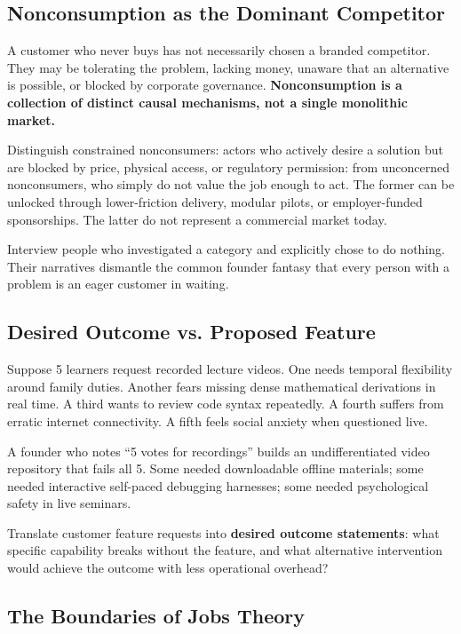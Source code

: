 \subsection{Nonconsumption as the Dominant Competitor}

A customer who never buys has not necessarily chosen a branded competitor. They may be tolerating the problem, lacking money, unaware that an alternative is possible, or blocked by corporate governance. \textbf{Nonconsumption is a collection of distinct causal mechanisms, not a single monolithic market.}

Distinguish constrained nonconsumers: actors who actively desire a solution but are blocked by price, physical access, or regulatory permission: from unconcerned nonconsumers, who simply do not value the job enough to act. The former can be unlocked through lower-friction delivery, modular pilots, or employer-funded sponsorships. The latter do not represent a commercial market today.

Interview people who investigated a category and explicitly chose to do nothing. Their narratives dismantle the common founder fantasy that every person with a problem is an eager customer in waiting.

\subsection{Desired Outcome vs. Proposed Feature}

Suppose 5 learners request recorded lecture videos. One needs temporal flexibility around family duties. Another fears missing dense mathematical derivations in real time. A third wants to review code syntax repeatedly. A fourth suffers from erratic internet connectivity. A fifth feels social anxiety when questioned live.

A founder who notes ``5 votes for recordings'' builds an undifferentiated video repository that fails all 5. Some needed downloadable offline materials; some needed interactive self-paced debugging harnesses; some needed psychological safety in live seminars.

Translate customer feature requests into \textbf{desired outcome statements}: what specific capability breaks without the feature, and what alternative intervention would achieve the outcome with less operational overhead?

\subsection{The Boundaries of Jobs Theory}

